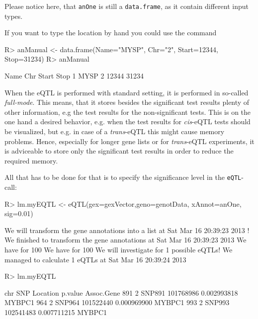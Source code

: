 \documentclass[a4paper,10pt]{article}
\begin{document}
Please notice here, that \texttt{anOne} is still a \texttt{data.frame}, as it contain different input types.

If you want to type the location by hand you could use the command 
\begin{Schunk}
\begin{Sinput}
R> anManual <- data.frame(Name="MYSP", Chr="2", Start=12344, Stop=31234)
R> anManual
\end{Sinput}
\begin{Soutput}
  Name Chr Start  Stop
1 MYSP   2 12344 31234
\end{Soutput}
\end{Schunk}

When the eQTL is performed with standard setting, it is performed in so-called \textit{full-mode}. This means, that
it stores besides the significant test results plenty of other information, e.g the test results for the non-significant 
tests. This is on the one hand a desired behavior, e.g. when the test results for \textit{cis}-eQTL tests should be
visualized, but e.g. in case of a \textit{trans}-eQTL this might cause memory problems. Hence, especially for longer 
gene lists or for \textit{trans}-eQTL experiments, it is adviceable to store only the significant test results in order
to reduce the required memory. 

All that has to be done for that is to specify the significance level in the \texttt{eQTL}-call:
\begin{Schunk}
\begin{Sinput}
R> lm.myEQTL <- eQTL(gex=gexVector,geno=genotData, xAnnot=anOne, sig=0.01)
\end{Sinput}
\begin{Soutput}
We will transform the gene annotations into a list at Sat Mar 16 20:39:23 2013 !
We finished to transform the gene annotations at Sat Mar 16 20:39:23 2013 
We have for 100 % of the samples in the expression data the genotype information. 
We have for 100 % of the expression data the annotations. 
We will investigate for 1 possible eQTLs! 
We managed to calculate 1 eQTLs at Sat Mar 16 20:39:24 2013 
\end{Soutput}
\begin{Sinput}
R> lm.myEQTL
\end{Sinput}
\begin{Soutput}
    chr    SNP  Location     p.value Assoc.Gene
891   2 SNP891 101768986 0.002993818     MYBPC1
964   2 SNP964 101522440 0.000969900     MYBPC1
993   2 SNP993 102541483 0.007711215     MYBPC1
\end{Soutput}
\end{Schunk}
\end{document}
